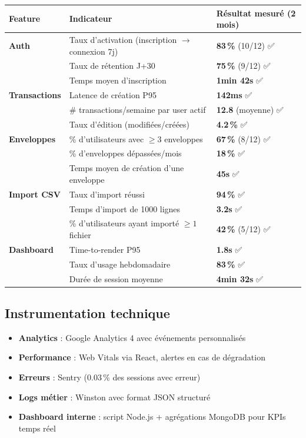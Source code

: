 \begin{center}
\scriptsize
\begin{tabular}{|p{3cm}|p{5.5cm}|p{5cm}|}
\hline
\textbf{Feature} & \textbf{Indicateur} & \textbf{Résultat mesuré (2 mois)} \\
\hline
\textbf{Auth} & Taux d'activation (inscription $\rightarrow$ connexion 7j) & \textbf{83\,\%} (10/12) ✅ \\
 & Taux de rétention J+30 & \textbf{75\,\%} (9/12) ✅ \\
 & Temps moyen d'inscription & \textbf{1min 42s} ✅ \\
\hline
\textbf{Transactions} & Latence de création P95 & \textbf{142ms} ✅ \\
 & \# transactions/semaine par user actif & \textbf{12.8} (moyenne) ✅ \\
 & Taux d'édition (modifiées/créées) & \textbf{4.2\,\%} ✅ \\
\hline
\textbf{Enveloppes} & \% d'utilisateurs avec $\geq 3$ enveloppes & \textbf{67\,\%} (8/12) ✅ \\
 & \% d'enveloppes dépassées/mois & \textbf{18\,\%} ✅ \\
 & Temps moyen de création d'une enveloppe & \textbf{45s} ✅ \\
\hline
\textbf{Import CSV} & Taux d'import réussi & \textbf{94\,\%} ✅ \\
 & Temps d'import de 1000 lignes & \textbf{3.2s} ✅ \\
 & \% d'utilisateurs ayant importé $\geq 1$ fichier & \textbf{42\,\%} (5/12) ✅ \\
\hline
\textbf{Dashboard} & Time-to-render P95 & \textbf{1.8s} ✅ \\
 & Taux d'usage hebdomadaire & \textbf{83\,\%} ✅ \\
 & Durée de session moyenne & \textbf{4min 32s} ✅ \\
\hline
\end{tabular}
\end{center}

\subsection{Instrumentation technique}

\begin{itemize}
  \item \textbf{Analytics} : Google Analytics 4 avec événements personnalisés
  \item \textbf{Performance} : Web Vitals via React, alertes en cas de dégradation
  \item \textbf{Erreurs} : Sentry (0.03\,\% des sessions avec erreur)
  \item \textbf{Logs métier} : Winston avec format JSON structuré
  \item \textbf{Dashboard interne} : script Node.js + agrégations MongoDB pour KPIs temps réel
\end{itemize}

